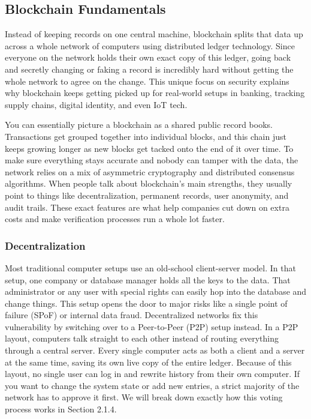 \subsection{Blockchain Fundamentals}

Instead of keeping records on one central machine, blockchain splits that data up across a whole network of computers using distributed ledger technology. Since everyone on the network holds their own exact copy of this ledger, going back and secretly changing or faking a record is incredibly hard without getting the whole network to agree on the change. This unique focus on security explains why blockchain keeps getting picked up for real-world setups in banking, tracking supply chains, digital identity, and even IoT tech\cite{zheng2017blockchain}.

You can essentially picture a blockchain as a shared public record books. Transactions get grouped together into individual blocks, and this chain just keeps growing longer as new blocks get tacked onto the end of it over time. To make sure everything stays accurate and nobody can tamper with the data, the network relies on a mix of asymmetric cryptography and distributed consensus algorithms. When people talk about blockchain's main strengths, they usually point to things like decentralization, permanent records, user anonymity, and audit trails. These exact features are what help companies cut down on extra costs and make verification processes run a whole lot faster.

\subsubsection{Decentralization}
Most traditional computer setups use an old-school client-server model. In that setup, one company or database manager holds all the keys to the data. That administrator or any user with special rights can easily hop into the database and change things. This setup opens the door to major risks like a single point of failure (SPoF)\cite{yuan2014testing} or internal data fraud. Decentralized networks fix this vulnerability by switching over to a Peer-to-Peer (P2P) setup instead. In a P2P layout, computers talk straight to each other instead of routing everything through a central server\cite{stoica_chord}. Every single computer acts as both a client and a server at the same time, saving its own live copy of the entire ledger. Because of this layout, no single user can log in and rewrite history from their own computer. If you want to change the system state or add new entries, a strict majority of the network has to approve it first. We will break down exactly how this voting process works in Section 2.1.4.

